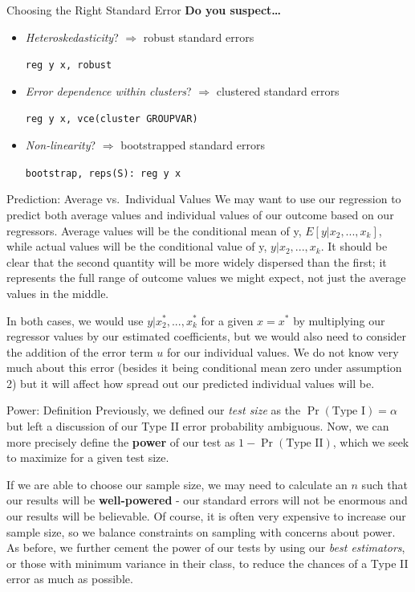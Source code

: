 \documentclass[
  ignorenonframetext,
  english,
]{beamer}
\begin{document}
\begin{frame}[fragile]{Choosing the Right Standard Error}
\protect{}\label{choosing-the-right-standard-error}
\textbf{Do you suspect\ldots{}}

\begin{itemize}
\item
  \emph{Heteroskedasticity}? \(\Rightarrow\) robust standard errors

  \texttt{reg\ y\ x,\ robust}
\item
  \emph{Error dependence within clusters}? \(\Rightarrow\) clustered
  standard errors

  \texttt{reg\ y\ x,\ vce(cluster\ GROUPVAR)}
\item
  \emph{Non-linearity}? \(\Rightarrow\) bootstrapped standard errors

  \texttt{bootstrap,\ reps(S):\ reg\ y\ x}
\end{itemize}
\end{frame}

\begin{frame}{Prediction: Average vs.~Individual Values}
\protect{}\label{prediction-average-vs.-individual-values}
We may want to use our regression to predict both average values and
individual values of our outcome based on our regressors. Average values
will be the conditional mean of y, \(E[y|x_2,...,x_k]\), while actual
values will be the conditional value of y, \(y|x_2,...,x_k\). It should
be clear that the second quantity will be more widely dispersed than the
first; it represents the full range of outcome values we might expect,
not just the average values in the middle.

In both cases, we would use \(y|x^*_2,...,x_k^*\) for a given \(x=x^*\)
by multiplying our regressor values by our estimated coefficients, but
we would also need to consider the addition of the error term \(u\) for
our individual values. We do not know very much about this error
(besides it being conditional mean zero under assumption 2) but it will
affect how spread out our predicted individual values will be.
\end{frame}

\begin{frame}{Power: Definition}
\protect{}\label{power-definition}
Previously, we defined our \emph{test size} as the
\(\Pr(\text{Type I})=\alpha\) but left a discussion of our Type II error
probability ambiguous. Now, we can more precisely define the
\textbf{power} of our test as \(1-\Pr(\text{Type II})\), which we seek
to maximize for a given test size.

If we are able to choose our sample size, we may need to calculate an
\(n\) such that our results will be \textbf{well-powered} - our standard
errors will not be enormous and our results will be believable. Of
course, it is often very expensive to increase our sample size, so we
balance constraints on sampling with concerns about power. As before, we
further cement the power of our tests by using our \emph{best
estimators}, or those with minimum variance in their class, to reduce
the chances of a Type II error as much as possible.
\end{frame}
\end{document}
